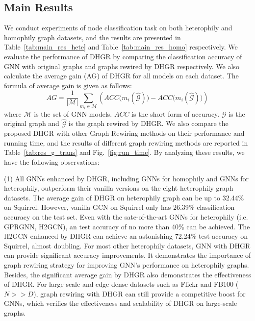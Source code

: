 \documentclass[sigconf]{acmart}
\begin{document}
	\subsection{Main Results}
	\label{sec:main_res}
	We conduct experiments of node classification task on both heterophily and homophily graph datasets, and the results are presented in Table~\ref{tab:main_res_hete} and Table~\ref{tab:main_res_homo} respectively. We evaluate the performance of DHGR by comparing the classification accuracy of GNN with original graphs and graphs rewired by DHGR respectively. We also calculate the average gain (AG) of DHGR for all models on each dataset. The formula of average gain is given as follows:
	\begin{equation}
	AG = \frac{1}{|\mathcal{M}|}\sum_{m_i\in\mathcal{M}} \left( ACC\big(m_i(\widehat{\mathcal{G}})\big) - ACC\big(m_i(\widehat{\mathcal{G}})\big) \right)
	\end{equation}
	where $\mathcal{M}$ is the set of GNN models. $ACC$ is the short form of accuracy.  $\mathcal{G}$ is the original graph and $\widehat{\mathcal{G}}$ is the graph rewired by DHGR.  We also compare the proposed DHGR with other Graph Rewiring methods on their performance and running time, and the results of different graph rewiring methods are reported in Table~\ref{tab:res_g_trans} and Fig.~\ref{fig:run_time}. By analyzing these results,  we have the following observations:
	
	(1) All GNNs enhanced by DHGR, including GNNs for homophily and GNNs for heterophily, outperform their vanilla versions on the eight heterophily graph datasets.  The average gain of DHGR on heterophily graph can be up to 32.44\% on Squirrel. However,  vanilla GCN on Squirrel only has 26.39\% classification accuracy on the test set. Even with the sate-of-the-art GNNs for heterophily (i.e. GPRGNN, H2GCN),  an test accuracy of no more than 40\% can be achieved. The H2GCN enhanced by DHGR can achieve an astonishing 72.24\% test accuracy on Squirrel, almost doubling. For most other heterophily datasets, GNN with DHGR can provide significant accuracy improvements. It demonstrates the importance of graph rewiring strategy for improving GNN's performance on heterophily graphs. Besides, the significant average gain by DHGR also demonstrates the effectiveness of DHGR.  For large-scale and edge-dense datasets such as Flickr and FB100 ($N>>D$), graph rewiring with DHGR can still provide a competitive boost for GNNs, which verifies the effectiveness and scalability of DHGR on large-scale graphs.
	
\end{document}
